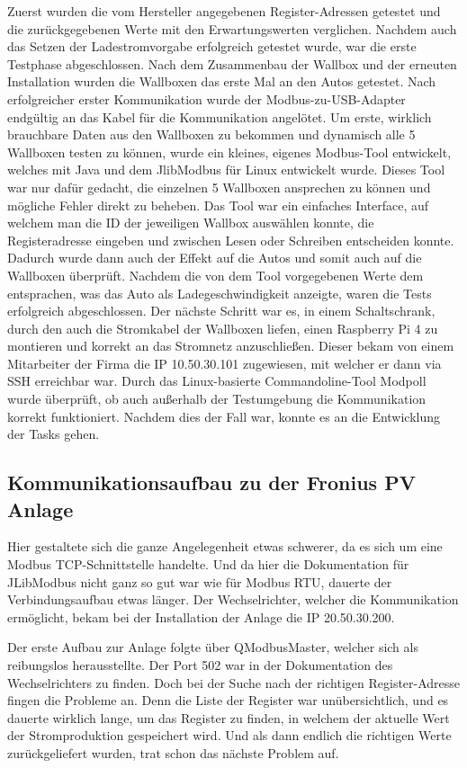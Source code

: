 Zuerst wurden die vom Hersteller angegebenen Register-Adressen getestet und die zurückgegebenen Werte mit den Erwartungswerten verglichen. Nachdem auch das Setzen der Ladestromvorgabe erfolgreich getestet wurde, war die erste Testphase abgeschlossen. Nach dem Zusammenbau der Wallbox und der erneuten Installation wurden die Wallboxen das erste Mal an den Autos getestet. Nach erfolgreicher erster Kommunikation wurde der Modbus-zu-USB-Adapter endgültig an das Kabel für die Kommunikation angelötet. Um erste, wirklich brauchbare Daten aus den Wallboxen zu bekommen und dynamisch alle 5 Wallboxen testen zu können, wurde ein kleines, eigenes Modbus-Tool entwickelt, welches mit Java und dem JlibModbus für Linux entwickelt wurde. Dieses Tool war nur dafür gedacht, die einzelnen 5 Wallboxen ansprechen zu können und mögliche Fehler direkt zu beheben. Das Tool war ein einfaches Interface, auf welchem man die ID der jeweiligen Wallbox auswählen konnte, die Registeradresse eingeben und zwischen Lesen oder Schreiben entscheiden konnte. Dadurch wurde dann auch der Effekt auf die Autos und somit auch auf die Wallboxen überprüft. Nachdem die von dem Tool vorgegebenen Werte dem entsprachen, was das Auto als Ladegeschwindigkeit anzeigte, waren die Tests erfolgreich abgeschlossen. Der nächste Schritt war es, in einem Schaltschrank, durch den auch die Stromkabel der Wallboxen liefen, einen Raspberry Pi 4 zu montieren und korrekt an das Stromnetz anzuschließen. Dieser bekam von einem Mitarbeiter der Firma die IP 10.50.30.101 zugewiesen, mit welcher er dann via SSH erreichbar war. Durch das Linux-basierte Commandoline-Tool Modpoll wurde überprüft, ob auch außerhalb der Testumgebung die Kommunikation korrekt funktioniert. Nachdem dies der Fall war, konnte es an die Entwicklung der Tasks gehen. 

\subsection{Kommunikationsaufbau zu der Fronius PV Anlage }
Hier gestaltete sich die ganze Angelegenheit etwas schwerer, da es sich um eine Modbus TCP-Schnittstelle handelte. Und da hier die Dokumentation für JLibModbus nicht ganz so gut war wie für Modbus RTU, dauerte der Verbindungsaufbau etwas länger. Der Wechselrichter, welcher die Kommunikation ermöglicht, bekam bei der Installation der Anlage die IP 20.50.30.200.   

Der erste Aufbau zur Anlage folgte über QModbusMaster, welcher sich als reibungslos herausstellte. Der Port 502 war in der Dokumentation des Wechselrichters zu finden. Doch bei der Suche nach der richtigen Register-Adresse fingen die Probleme an. Denn die Liste der Register war unübersichtlich, und es dauerte wirklich lange, um das Register zu finden, in welchem der aktuelle Wert der Stromproduktion gespeichert wird. Und als dann endlich die richtigen Werte zurückgeliefert wurden, trat schon das nächste Problem auf.   

